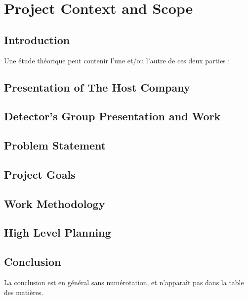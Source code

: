 \setcounter{mtc}{4} %
\setcounter{chapter}{0}
\chapter{Project Context and Scope}
\minitoc  %

\graphicspath{{Chapitre1/figures/}}
\pagestyle{fancy}
\fancyhf{}
\fancyfoot[R]{\thepage}
\renewcommand{\headrulewidth}{0.5pt}
\renewcommand{\footrulewidth}{0pt}

\begin{spacing}{1.2}

\section*{Introduction}
Une étude théorique \cite{knuthwebsite} peut contenir l'une et/ou l'autre de ces deux parties :
\section{Presentation of The Host Company} 
\section{Detector's Group Presentation and Work}
\section{Problem Statement}
\section{Project Goals}
\section{Work Methodology}
\section{High Level Planning}

\section*{Conclusion}
La conclusion est en général sans numérotation, et n'apparaît pas dans la table des matières.


\end{spacing}
